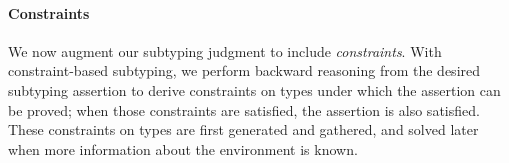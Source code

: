 \paragraph{Constraints}
We now augment our subtyping judgment to include \emph{constraints}.
With constraint-based subtyping, we perform backward reasoning from the
desired subtyping assertion to derive constraints on types under which the
assertion can be proved; 
when those constraints are satisfied, the assertion is also satisfied. 
These constraints on types are first generated and gathered, 
and solved later when more information about the environment is known.



